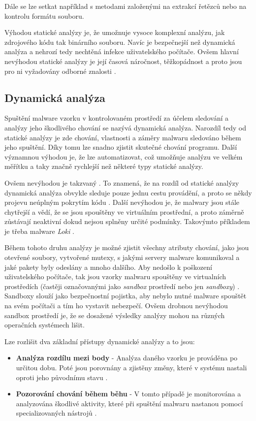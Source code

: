 Dále se lze setkat například s metodami založenými na extrakcí řetězců nebo na kontrolu formátu souboru.

Výhodou statické analýzy je, že umožnuje vysoce komplexní analýzu, jak zdrojového kódu tak binárního souboru. Navíc je bezpečnejší než dynamická analýza a nehrozí tedy nechtěná infekce uživatelského počítače.
Ovšem hlavní nevýhodou statické analýzy je její časová náročnost, těžkopádnost a proto jsou pro ni vyžadovány odborné znalosti \cite{article_analysis_goat}.

\newpage
\subsection*{Dynamická analýza} \label{dynamic}
Spuštění malware vzorku v kontrolovaném prostředí za účelem sledování a analýzy jeho škodlivého chování se nazývá dynamická analýza.
Narozdíl tedy od statické analýzy je zde chování, vlastnosti a záměry malwaru sledováno během jeho spuštění.
Díky tomu lze snadno zjistit skutečné chování programu. Další významnou výhodou je, že lze automatizovat, což umožňuje analýzu ve velkém měřítku a taky značně rychlejší než některé typy statické analýzy.

Ovšem nevýhodou je takzvaný . To znamená, že na rozdíl od statické analýzy dynamická analýza obvykle sleduje pouze jednu cestu provádění, a proto se někdy projevu
neúplným pokrytím kódu \cite{article_analysis_goat}. Další nevýhodou je, že malwary jsou stále chytřejší a vědí, že se jsou spouštěny ve virtuálním prostřední, a proto záměrně zůstávají neaktivní dokud nejsou splněny určité podmínky. Takovýmto příkladem je třeba malware \textit{Loki} \cite{malware_analysis}.

Během tohoto druhu analýzy je možné zjistit všechny atributy chování, jako jsou otevřené soubory, vytvořené mutexy, s jakými servery malware komunikoval a jaké pakety byly odeslány a mnoho dalšího.
\label{sandbox}Aby nedošlo k poškození uživatelského počítače, tak jsou vzorky malwaru spouštěny ve virtualních prostředích (častěji označovanými jako \textit{sandbox} prostředí nebo jen \textit{sandboxy}) \cite{malware_analysis}. Sandboxy slouží jako bezpečnostní pojistka, aby
nebylo nutné malware spouštět na svém počítači a tím ho vystavit nebezpečí. Ovšem drobnou nevýhodou sandbox prostředí je, že se dosažené výsledky analýzy mohou na různých operačních systémech lišit.

Lze rozlišit dva základní přístupy dynamické analýzy a to jsou:
\begin{itemize}
    \item \textbf{Analýza rozdílu mezi body} - Analýza daného vzorku je prováděna po určitou dobu. Poté jsou porovnány a zjistěny změny, které v systému nastali oproti jeho původnímu stavu \cite{article_analysis_goat}.
    \item \textbf{Pozorování chování během běhu} - V tomto případě je monitorována a analyzována škodlivé aktivity, které při spuštění malwaru nastanou pomocí specializovaných nástrojů \cite{article_analysis_goat}. 
\end{itemize}

